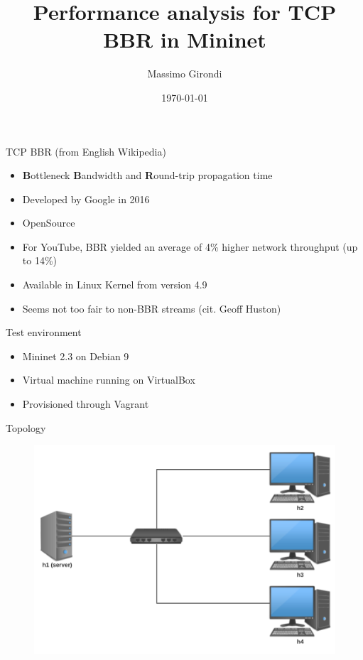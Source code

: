 \documentclass[13pt,aspectratio=43]{beamer}
\title{
	Performance analysis for TCP BBR in Mininet
}
\date{\today}
\author{Massimo Girondi}
\begin{document}
\maketitle

\begin{frame}{TCP BBR (from English Wikipedia)}
	\begin{itemize}
		\item \textbf{B}ottleneck \textbf{B}andwidth and \textbf{R}ound-trip propagation time
		\item Developed by Google in 2016
		\item OpenSource
		\item For YouTube, BBR yielded an average of 4\% higher network throughput (up to 14\%)
		\item Available in Linux Kernel from version 4.9
		\item Seems not too fair to non-BBR streams (cit. Geoff Huston)
	\end{itemize}
\end{frame}

\begin{frame}{Test environment}
	\begin{itemize}
		\item Mininet 2.3 on Debian 9
		\item Virtual machine running on VirtualBox
		\item Provisioned through Vagrant 
	\end{itemize}
\end{frame}
\begin{frame}{Topology}
  \begin{figure}
	  \includegraphics[width=\textwidth,height=\textheight,keepaspectratio]{network.pdf}
  \end{figure}
\end{frame}
\end{document}
